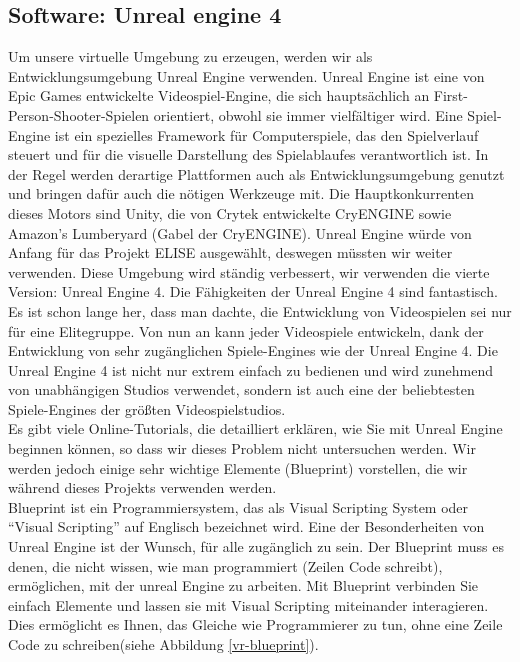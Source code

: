 \subsection{Software: Unreal engine 4} \label{vr-software}

Um unsere virtuelle Umgebung zu erzeugen, werden wir als Entwicklungsumgebung Unreal Engine verwenden. 
Unreal Engine ist eine von Epic Games entwickelte Videospiel-Engine, die sich haupts{\"a}chlich an First-Person-Shooter-Spielen orientiert, obwohl sie immer vielf{\"a}ltiger wird. 
Eine Spiel-Engine ist ein spezielles Framework f{\"u}r Computerspiele, das den Spielverlauf steuert und f{\"u}r die visuelle Darstellung des Spielablaufes verantwortlich ist. 
In der Regel werden derartige Plattformen auch als Entwicklungsumgebung genutzt und bringen daf{\"u}r auch die n{\"o}tigen Werkzeuge mit. 
Die Hauptkonkurrenten dieses Motors sind Unity, die von Crytek entwickelte CryENGINE sowie Amazon's Lumberyard (Gabel der CryENGINE). 
Unreal Engine w{\"u}rde von Anfang f{\"u}r das Projekt ELISE ausgew{\"a}hlt, deswegen m{\"u}ssten wir weiter verwenden. 
Diese Umgebung wird st{\"a}ndig verbessert, wir verwenden die vierte Version: Unreal Engine 4. 
Die F{\"a}higkeiten der Unreal Engine 4 sind fantastisch. 
Es ist schon lange her, dass man dachte, die Entwicklung von Videospielen sei nur f{\"u}r eine Elitegruppe. 
Von nun an kann jeder Videospiele entwickeln, dank der Entwicklung von sehr zug{\"a}nglichen Spiele-Engines wie der Unreal Engine 4. 
Die Unreal Engine 4 ist nicht nur extrem einfach zu bedienen und wird zunehmend von unabh{\"a}ngigen Studios verwendet, sondern ist auch eine der beliebtesten Spiele-Engines der gr{\"o}{\ss}ten Videospielstudios. \\

Es gibt viele Online-Tutorials, die detailliert erkl{\"a}ren, wie Sie mit Unreal Engine beginnen k{\"o}nnen, so dass wir dieses Problem nicht untersuchen werden. 
Wir werden jedoch einige sehr wichtige Elemente (Blueprint) vorstellen, die wir w{\"a}hrend dieses Projekts verwenden werden. \\

Blueprint ist ein Programmiersystem, das als Visual Scripting System oder ``Visual Scripting'' auf Englisch bezeichnet wird. 
Eine der Besonderheiten von Unreal Engine ist der Wunsch, f{\"u}r alle zug{\"a}nglich zu sein. 
Der Blueprint muss es denen, die nicht wissen, wie man programmiert (Zeilen Code schreibt), erm{\"o}glichen, mit der unreal Engine zu arbeiten. 
Mit Blueprint verbinden Sie einfach Elemente und lassen sie mit Visual Scripting miteinander interagieren. 
Dies erm{\"o}glicht es Ihnen, das Gleiche wie Programmierer zu tun, ohne eine Zeile Code zu schreiben(siehe Abbildung \ref{vr-blueprint}).\\

